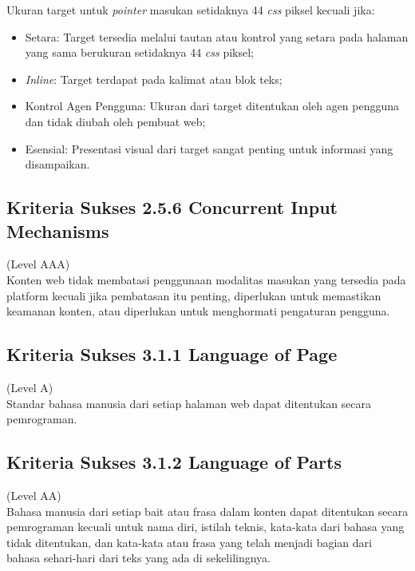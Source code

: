 Ukuran target untuk \textit{pointer} masukan setidaknya 44 \textit{css} piksel kecuali jika:

\begin{itemize}
	\item Setara: Target tersedia melalui tautan atau kontrol yang setara pada halaman yang sama berukuran setidaknya 44 \textit{css} piksel;
	\item \textit{Inline}: Target terdapat pada kalimat atau blok teks;
	\item Kontrol Agen Pengguna: Ukuran dari target ditentukan oleh agen pengguna dan tidak diubah oleh pembuat web;
	\item Esensial: Presentasi visual dari target sangat penting untuk informasi yang disampaikan.
\end{itemize}

\subsection{Kriteria Sukses 2.5.6 Concurrent Input Mechanisms}
\label{subsec:kriteria_2.5.6}
(Level AAA) \\

Konten web tidak membatasi penggunaan modalitas masukan yang tersedia pada platform kecuali jika pembatasan itu penting, diperlukan untuk memastikan keamanan konten, atau diperlukan untuk menghormati pengaturan pengguna.

\subsection{Kriteria Sukses 3.1.1 Language of Page}
\label{subsec:kriteria_3.1.1}
(Level A) \\

Standar bahasa manusia dari setiap halaman web dapat ditentukan secara pemrograman.

\subsection{Kriteria Sukses 3.1.2 Language of Parts}
\label{subsec:kriteria_3.1.2}
(Level AA) \\

Bahasa manusia dari setiap bait atau frasa dalam konten dapat ditentukan secara pemrograman kecuali untuk nama diri, istilah teknis, kata-kata dari bahasa yang tidak ditentukan, dan kata-kata atau frasa yang telah menjadi bagian dari bahasa sehari-hari dari teks yang ada di sekelilingnya.

